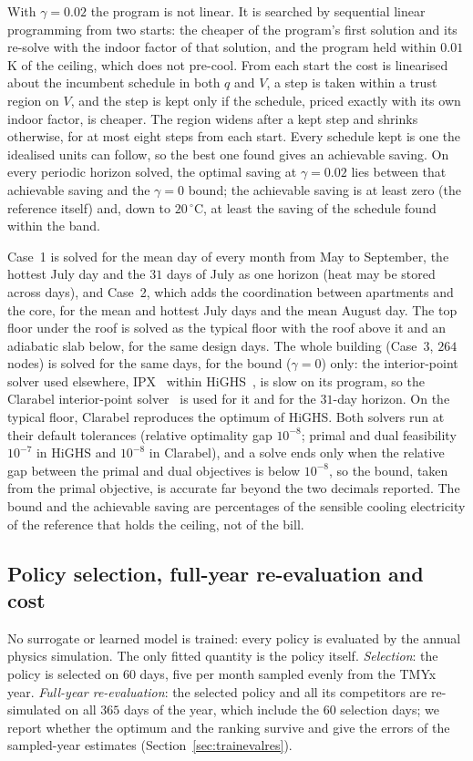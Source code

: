 \documentclass[10pt,a4paper,twocolumn]{article}
\theoremstyle{definition}
\begin{document}
With $\gamma=0.02$ the program is not linear. It is searched by sequential linear programming from two starts: the cheaper of the program's first solution and its re-solve with the indoor factor of that solution, and the program held within $0.01\,$K of the ceiling, which does not pre-cool. From each start the cost is linearised about the incumbent schedule in both $q$ and $V$, a step is taken within a trust region on $V$, and the step is kept only if the schedule, priced exactly with its own indoor factor, is cheaper. The region widens after a kept step and shrinks otherwise, for at most eight steps from each start. Every schedule kept is one the idealised units can follow, so the best one found gives an achievable saving. On every periodic horizon solved, the optimal saving at $\gamma=0.02$ lies between that achievable saving and the $\gamma=0$ bound; the achievable saving is at least zero (the reference itself) and, down to $20\,^{\circ}$C, at least the saving of the schedule found within the band.

Case~1 is solved for the mean day of every month from May to September, the hottest July day and the $31$ days of July as one horizon (heat may be stored across days), and Case~2, which adds the coordination between apartments and the core, for the mean and hottest July days and the mean August day. The top floor under the roof is solved as the typical floor with the roof above it and an adiabatic slab below, for the same design days. The whole building (Case~3, $264$ nodes) is solved for the same days, for the bound ($\gamma=0$) only: the interior-point solver used elsewhere, IPX~\citep{schork2020ipx} within HiGHS~\citep{huangfu2018highs}, is slow on its program, so the Clarabel interior-point solver~\citep{goulart2026clarabel} is used for it and for the $31$-day horizon. On the typical floor, Clarabel reproduces the optimum of HiGHS. Both solvers run at their default tolerances (relative optimality gap $10^{-8}$; primal and dual feasibility $10^{-7}$ in HiGHS and $10^{-8}$ in Clarabel), and a solve ends only when the relative gap between the primal and dual objectives is below $10^{-8}$, so the bound, taken from the primal objective, is accurate far beyond the two decimals reported. The bound and the achievable saving are percentages of the sensible cooling electricity of the reference that holds the ceiling, not of the bill.

\subsection{Policy selection, full-year re-evaluation and cost}\label{sec:gasetup}
No surrogate or learned model is trained: every policy is evaluated by the annual physics simulation. The only fitted quantity is the policy itself. \emph{Selection}: the policy is selected on $60$ days, five per month sampled evenly from the TMYx year. \emph{Full-year re-evaluation}: the selected policy and all its competitors are re-simulated on all $365$ days of the year, which include the $60$ selection days; we report whether the optimum and the ranking survive and give the errors of the sampled-year estimates (Section~\ref{sec:trainevalres}).
\end{document}
